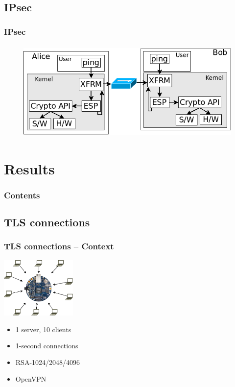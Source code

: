 \documentclass[xcolor={x11names, rgb, usenames, dvipsnames}]{beamer}
\begin{document}
\subsection{IPsec}
\begin{frame}
\frametitle{IPsec}
	\begin{figure}
	\includegraphics[height=5cm]{ipsec-transfer.png}
	\end{figure}
\end{frame}




\section{Results}
\begin{frame}
\frametitle{Contents}
\tableofcontents[%
	currentsection,
	sectionstyle=show/shaded,
	subsectionstyle=show/show/hide,
	]
\end{frame}


\subsection{TLS connections}

\begin{frame}
\frametitle{TLS connections -- Context}
\begin{center}
\includegraphics[height=3cm]{tls-bench.png}
\end{center}
\begin{itemize}
	\item 1 server, 10 clients
	\item 1-second connections
	\item RSA-1024/2048/4096
	\item OpenVPN
\end{itemize}
\end{frame}
\end{document}
